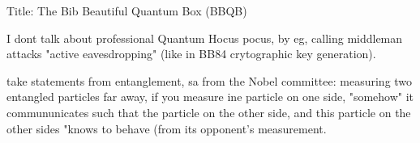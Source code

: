 Title: The Bib Beautiful Quantum Box (BBQB)


I dont talk about professional Quantum Hocus pocus, by eg, calling middleman attacks "active eavesdropping" (like in BB84 crytographic key generation).

take statements from entanglement, sa from the Nobel committee: measuring two entangled particles far away, if you measure ine particle on one side, "somehow" it commununicates such that the particle on the other side, and this particle on the other sides "knows to behave (from its opponent's measurement.

